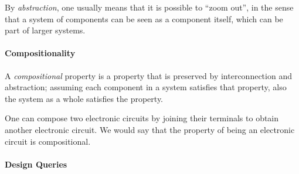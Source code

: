 By \emph{abstraction}, one usually means that it is possible to ``zoom out'',
in the sense that a system of components can be seen as a component itself,
which can be part of larger systems.



\paragraph{Compositionality}

A \emph{compositional} property is a property that is preserved by interconnection and abstraction; assuming each component in a system satisfies that property, also the system as a whole satisfies the property.

\begin{example}
One can compose two electronic circuits by joining their terminals to obtain
another electronic circuit. We would say that the property
of being an electronic circuit is compositional.
\end{example}



\paragraph{Design Queries}




